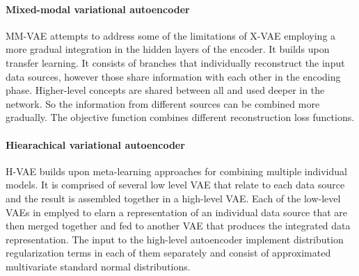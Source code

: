 			\paragraph{Mixed-modal variational autoencoder}
			MM-VAE attempts to address some of the limitations of X-VAE employing a more gradual integration in the hidden layers of the encoder.
			It builds upon transfer learning.
			It consists of branches that individually reconstruct the input data sources, however those share information with each other in the encoding phase.
			Higher-level concepts are shared between all and used deeper in the network.
			So the information from different sources can be combined more gradually.
			The objective function combines different reconstruction loss functions.

			\paragraph{Hiearachical variational autoencoder}
			H-VAE builds upon meta-learning approaches for combining multiple individual models.
			It is comprised of several low level VAE that relate to each data source and the result is assembled together in a high-level VAE.
			Each of the low-level VAEs in emplyed to elarn a representation of an individual data source that are then merged together and fed to another VAE that produces the integrated data representation.
			The input to the high-level autoencoder implement distribution regularization terms in each of them separately and consist of approximated multivariate standard normal distributions.

